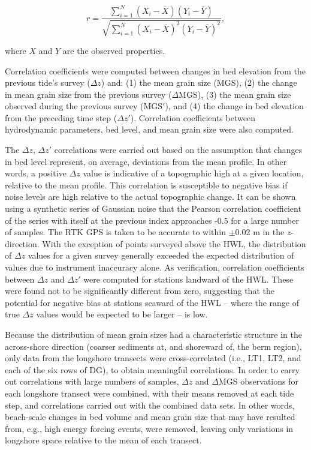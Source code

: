 \documentclass[preprint,12pt,authoryear]{elsarticle}
\begin{document}
\begin{equation}\label{eq:pearsons_r}
r = \frac{\sum_{i=1}^{N}(X_i-\overline{X})(Y_i-\overline{Y})}{\sqrt{\sum_{i=1}^{N}(X_i-\overline{X})^2 (Y_i-\overline{Y})^2}},
\end{equation}

\noindent where $X$ and $Y$ are the observed properties.

Correlation coefficients were computed between changes in bed elevation from the previous tide's survey ($\Delta z$) and: (1) the mean grain size (MGS), (2) the change in mean grain size from the previous survey ($\Delta$MGS), (3) the mean grain size observed during the previous survey (MGS$'$), and (4) the change in bed elevation from the preceding time step ($\Delta z'$). Correlation coefficients between hydrodynamic parameters, bed level, and mean grain size were also computed. 

The $\Delta z$, $\Delta z'$ correlations were carried out based on the assumption that changes in bed level represent, on average, deviations from the mean profile. In other words, a positive $\Delta z$ value is indicative of a topographic high at a given location, relative to the mean profile. This correlation is susceptible to negative bias if noise levels are high relative to the actual topographic change. It can be shown using a synthetic series of Gaussian noise that the Pearson correlation coefficient of the series with itself at the previous index approaches -0.5 for a large number of samples. The RTK GPS is taken to be accurate to within $\pm$0.02 m in the $z$-direction. With the exception of points surveyed above the HWL, the distribution of $\Delta z$ values for a given survey generally exceeded the expected distribution of values due to instrument inaccuracy alone. As verification, correlation coefficients between $\Delta z$ and $\Delta z'$ were computed for stations landward of the HWL. These were found not to be significantly different from zero, suggesting that the potential for negative bias at stations seaward of the HWL -- where the range of true $\Delta z$ values would be expected to be larger -- is low.

Because the distribution of mean grain sizes had a characteristic structure in the across-shore direction (coarser sediments at, and shoreward of, the berm region), only data from the longshore transects were cross-correlated (i.e., LT1, LT2, and each of the six rows of DG), to obtain meaningful correlations. In order to carry out correlations with large numbers of samples, $\Delta z$ and $\Delta$MGS observations for each longshore transect were combined, with their means removed at each tide step, and correlations carried out with the combined data sets. In other words, beach-scale changes in bed volume and mean grain size that may have resulted from, e.g., high energy forcing events, were removed, leaving only variations in longshore space relative to the mean of each transect.
\end{document}
